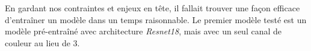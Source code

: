 En gardant nos contraintes et enjeux en tête, il fallait trouver une façon efficace d'entraîner un modèle dans un temps raisonnable. Le premier modèle testé est un modèle pré-entraîné avec architecture \emph{Resnet18}, mais avec un seul canal de couleur au lieu de 3. 